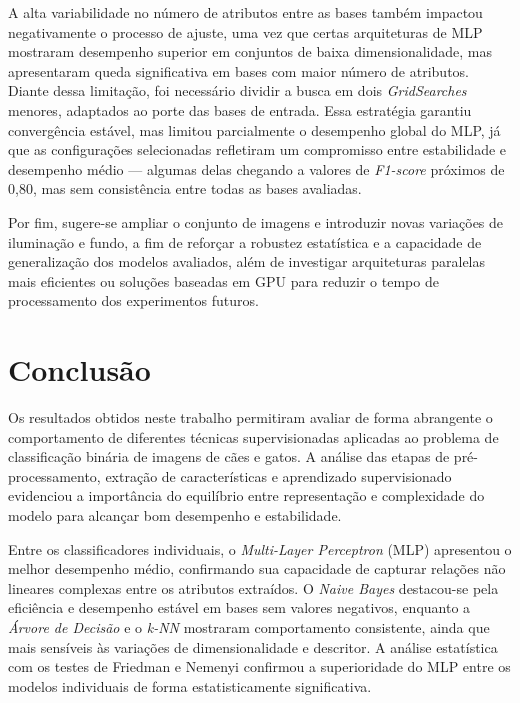 \documentclass[12pt]{article}
\begin{document}
A alta variabilidade no número de atributos entre as bases também impactou negativamente o processo de ajuste, uma vez que certas arquiteturas de MLP mostraram desempenho superior em conjuntos de baixa dimensionalidade, mas apresentaram queda significativa em bases com maior número de atributos. Diante dessa limitação, foi necessário dividir a busca em dois \textit{GridSearches} menores, adaptados ao porte das bases de entrada. Essa estratégia garantiu convergência estável, mas limitou parcialmente o desempenho global do MLP, já que as configurações selecionadas refletiram um compromisso entre estabilidade e desempenho médio — algumas delas chegando a valores de \textit{F1-score} próximos de 0,80, mas sem consistência entre todas as bases avaliadas.

Por fim, sugere-se ampliar o conjunto de imagens e introduzir novas variações de iluminação e fundo, a fim de reforçar a robustez estatística e a capacidade de generalização dos modelos avaliados, além de investigar arquiteturas paralelas mais eficientes ou soluções baseadas em GPU para reduzir o tempo de processamento dos experimentos futuros.



\section{Conclusão}

Os resultados obtidos neste trabalho permitiram avaliar de forma abrangente o comportamento de diferentes técnicas supervisionadas aplicadas ao problema de classificação binária de imagens de cães e gatos.  
A análise das etapas de pré-processamento, extração de características e aprendizado supervisionado evidenciou a importância do equilíbrio entre representação e complexidade do modelo para alcançar bom desempenho e estabilidade.

Entre os classificadores individuais, o \textit{Multi-Layer Perceptron} (MLP) apresentou o melhor desempenho médio, confirmando sua capacidade de capturar relações não lineares complexas entre os atributos extraídos.  
O \textit{Naive Bayes} destacou-se pela eficiência e desempenho estável em bases sem valores negativos, enquanto a \textit{Árvore de Decisão} e o \textit{k-NN} mostraram comportamento consistente, ainda que mais sensíveis às variações de dimensionalidade e descritor.  
A análise estatística com os testes de Friedman e Nemenyi confirmou a superioridade do MLP entre os modelos individuais de forma estatisticamente significativa.
\end{document}
